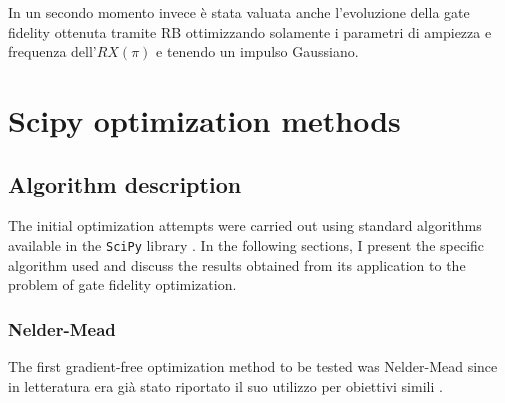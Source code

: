 

In un secondo momento invece è stata valuata anche l'evoluzione della gate fidelity ottenuta tramite RB ottimizzando solamente i parametri di ampiezza e frequenza dell'$RX(\pi)$ e tenendo un impulso Gaussiano.



\section{Scipy optimization methods}\label{Sec:OptimizationMethods}

\subsection{Algorithm description}
The initial optimization attempts were carried out using standard algorithms available in the \texttt{SciPy} library \cite{SciPy-NMeth}.
In the following sections, I present the specific algorithm used and discuss the results obtained from its application to the problem of gate fidelity optimization.

\subsubsection{Nelder-Mead}
The first gradient-free optimization method to be tested was Nelder-Mead since in letteratura era già stato riportato il suo utilizzo per obiettivi simili \cite{kelly_optimal_2014}.

